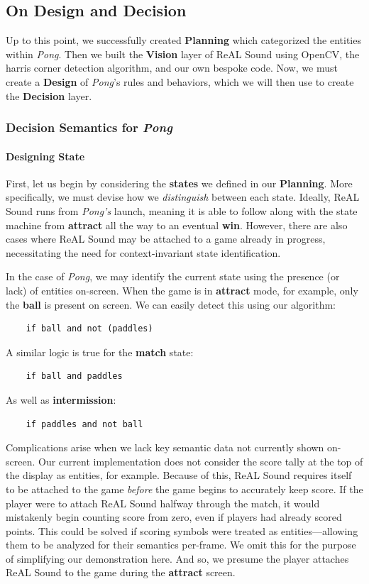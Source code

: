 \documentclass{report}
\newcommand{\rs}{ReAL Sound\xspace}
\newcommand{\plan}{\textbf{Planning}\xspace}
\newcommand{\design}{\textbf{Design}\xspace}
\newcommand{\state}[1]{\textbf{#1}}
\newcommand{\vision}{\textbf{Vision}\xspace}
\newcommand{\decision}{\textbf{Decision}\xspace}
\newcommand{\ball}{\textbf{ball}\xspace}
\begin{document}
\subsection{On Design and Decision}
Up to this point, we successfully created \plan which categorized the entities within \emph{Pong}. Then we built the \vision layer of \rs using OpenCV, the harris corner detection algorithm, and our own bespoke code. Now, we must create a \design of \emph{Pong}'s rules and behaviors, which we will then use to create the \decision layer. 

\subsubsection{Decision Semantics for \emph{Pong}}
\paragraph{Designing State}

First, let us begin by considering the \state{states} we defined in our \plan. More specifically, we must devise how we \emph{distinguish} between each state. Ideally, \rs runs from \emph{Pong's} launch, meaning it is able to follow along with the state machine from \state{attract} all the way to an eventual \state{win}. However, there are also cases where \rs may be attached to a game already in progress, necessitating the need for context-invariant state identification.

In the case of \emph{Pong}, we may identify the current state using the presence (or lack) of entities on-screen. When the game is in \state{attract} mode, for example, only the \ball is present on screen. We can easily detect this using our algorithm: 

\begin{lstlisting}
    if ball and not (paddles)
\end{lstlisting}

A similar logic is true for the \state{match} state:

\begin{lstlisting}
    if ball and paddles
\end{lstlisting}

As well as \state{intermission}:

\begin{lstlisting}
    if paddles and not ball
\end{lstlisting}

Complications arise when we lack key semantic data not currently shown on-screen. Our current implementation does not consider the score tally at the top of the display as entities, for example. Because of this, \rs requires itself to be attached to the game \emph{before} the game begins to accurately keep score. If the player were to attach \rs halfway through the match, it would mistakenly begin counting score from zero, even if players had already scored points. This could be solved if scoring symbols were treated as entities---allowing them to be analyzed for their semantics per-frame. We omit this for the purpose of simplifying our demonstration here. And so, we presume the player attaches \rs to the game during the \state{attract} screen. 
\end{document}
